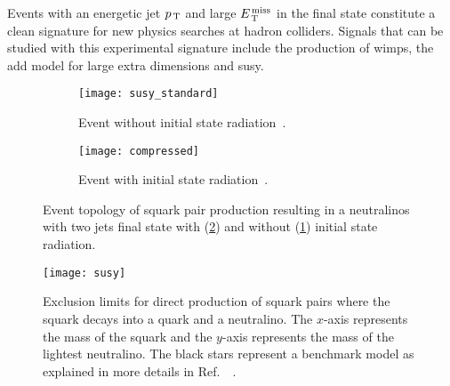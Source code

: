 Events with an energetic jet $p_\mathrm{\, T}$ and large $E_\mathrm{\, T}^\mathrm{\, miss}$ in the final state
constitute a clean signature for new physics searches at hadron colliders.
Signals that can be studied with this experimental signature include the
production of \glspl{wimp}, the \gls{add} model for large extra dimensions and
\gls{susy}.
\begin{figure}[!h]
  \centering
  \begin{subfigure}[t]{.48\linewidth}
    \texttt{[image: susy\_standard]}
    \caption{Event without initial state radiation~\cite{SUSYPub}.}
    \label{fig:susy_standard}
  \end{subfigure} \quad
  \begin{subfigure}[t]{.48\linewidth}
    \texttt{[image: compressed]}
    \caption{Event with initial state radiation~\cite{ExotPub}.}
    \label{fig:susy_compressed}
  \end{subfigure}
  \caption{Event topology of squark pair production resulting in a neutralinos
    with two jets final state with (\cref{fig:susy_compressed}) and without
    (\cref{fig:susy_standard}) initial state radiation.}
  \label{fig:motivation}
\end{figure}
\begin{figure}[!h]
  \centering
  \texttt{[image: susy]}
  \caption{Exclusion limits for direct production of squark
    pairs where the squark decays into a quark and a neutralino. The $x$-axis
    represents the mass of the squark and the $y$-axis represents the mass of
    the lightest neutralino. The black stars represent a benchmark model as
    explained in more details in Ref.~~\cite{SUSYPub}.}
  \label{fig:susy_exclusion}
\end{figure}
